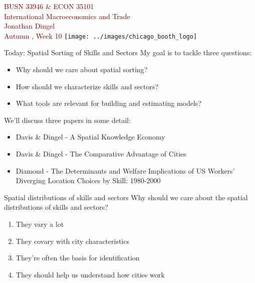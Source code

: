 \documentclass[10pt,notes=hide]{beamer}
\begin{document}
\begin{frame}[plain]
\begin{center}
\large
\textcolor{maroon}{BUSN 33946 \& ECON 35101\\
International Macroeconomics and Trade\\ 
Jonathan Dingel\\
Autumn \the\year, Week 10}
\vfill 
\texttt{[image: ../images/chicago\_booth\_logo]}
\end{center}
\end{frame}
\begin{frame}{Today: Spatial Sorting of Skills and Sectors}
My goal is to tackle three questions:
\begin{itemize}
	\item Why should we care about spatial sorting?
	\item How should we characterize skills and sectors?
	\item What tools are relevant for building and estimating models?
\end{itemize}
\vspace{5mm}
We'll discuss three papers in some detail:
\begin{itemize}
	\item Davis \& Dingel - A Spatial Knowledge Economy
	\item Davis \& Dingel - The Comparative Advantage of Cities
	\item Diamond - The Determinants and Welfare Implications of US Workers' Diverging Location Choices by Skill: 1980-2000 
\end{itemize}
\end{frame}
\begin{frame}{Spatial distributions of skills and sectors} 
Why should we care about the spatial distributions of skills and sectors?
\begin{enumerate}
	\item They vary a lot
	\item They covary with city characteristics
	\item They're often the basis for identification 
	\item They should help us understand how cities work
\end{enumerate}
\end{frame}
\end{document}
